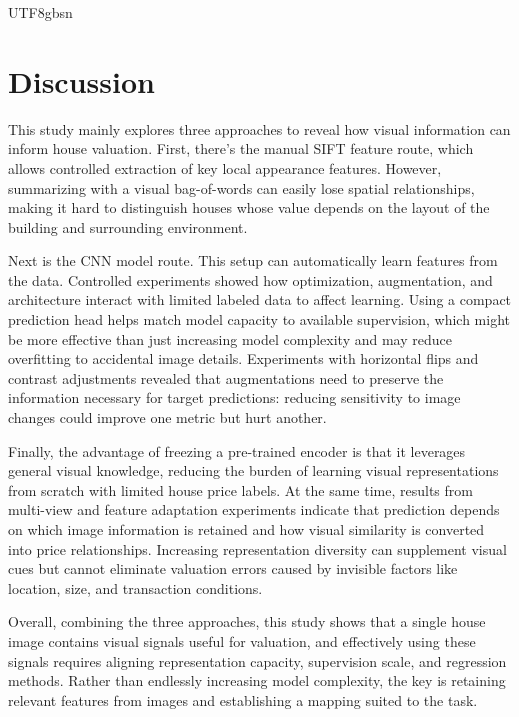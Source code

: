 \documentclass[conference,a4paper]{IEEEtran}
\begin{document}
\begin{CJK*}{UTF8}{gbsn}
\section{Discussion}
This study mainly explores three approaches to reveal how visual information can inform house valuation. First, there’s the manual SIFT feature route, which allows controlled extraction of key local appearance features. However, summarizing with a visual bag-of-words can easily lose spatial relationships, making it hard to distinguish houses whose value depends on the layout of the building and surrounding environment. 

Next is the CNN model route. This setup can automatically learn features from the data. Controlled experiments showed how optimization, augmentation, and architecture interact with limited labeled data to affect learning. Using a compact prediction head helps match model capacity to available supervision, which might be more effective than just increasing model complexity and may reduce overfitting to accidental image details. Experiments with horizontal flips and contrast adjustments revealed that augmentations need to preserve the information necessary for target predictions: reducing sensitivity to image changes could improve one metric but hurt another.

Finally, the advantage of freezing a pre-trained encoder is that it leverages general visual knowledge, reducing the burden of learning visual representations from scratch with limited house price labels. At the same time, results from multi-view and feature adaptation experiments indicate that prediction depends on which image information is retained and how visual similarity is converted into price relationships. Increasing representation diversity can supplement visual cues but cannot eliminate valuation errors caused by invisible factors like location, size, and transaction conditions. 

Overall, combining the three approaches, this study shows that a single house image contains visual signals useful for valuation, and effectively using these signals requires aligning representation capacity, supervision scale, and regression methods. Rather than endlessly increasing model complexity, the key is retaining relevant features from images and establishing a mapping suited to the task. 


\clearpage

\ifPDFTeX
\end{CJK*}
\fi
\end{document}
